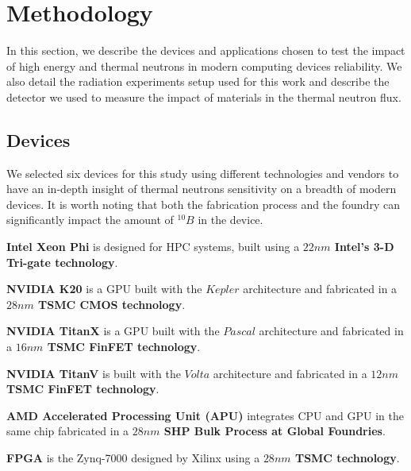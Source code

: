 \section{Methodology}
\label{sec_methodology}


In this section, we describe the devices and applications chosen to test the impact of high energy and thermal neutrons in modern computing devices reliability. We also detail the radiation experiments setup used for this work and describe the detector we used to measure the impact of materials in the thermal neutron flux.

\subsection{Devices}
\label{subsec_devices}

We selected six devices for this study using different technologies and vendors to have an in-depth insight of thermal neutrons sensitivity on a breadth of modern devices. It is worth noting that both the fabrication process and the foundry can significantly impact the amount of $^{10}B$ in the device.

\textbf{Intel Xeon Phi} is designed for HPC systems, built using a \textbf{$22nm$ Intel's 3-D Tri-gate technology}.

\textbf{NVIDIA K20} is a GPU built with the $Kepler$ architecture and fabricated in a \textbf{$28nm$ TSMC CMOS technology}.

\textbf{NVIDIA TitanX} is a GPU built with the $Pascal$ architecture and fabricated in a \textbf{$16nm$ TSMC FinFET technology}.

\textbf{NVIDIA TitanV} is built with the $Volta$ architecture and fabricated in a \textbf{$12nm$ TSMC FinFET technology}.

\textbf{AMD Accelerated Processing Unit (APU)} integrates CPU and GPU in the same chip fabricated in a \textbf{$28nm$ SHP Bulk Process at Global Foundries}.

\textbf{FPGA} is the Zynq-7000 designed by Xilinx using a \textbf{$28nm$ TSMC technology}.

